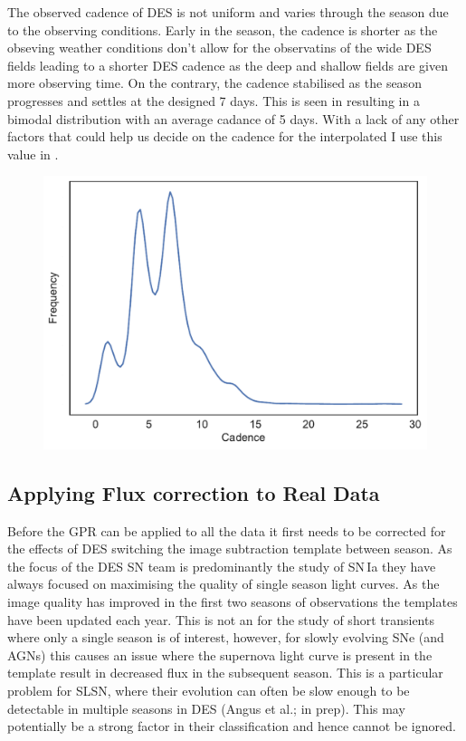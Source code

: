 The observed cadence of DES is not uniform and varies through the season due to the observing conditions. Early in the season, the cadence is shorter as the obseving weather conditions don't allow for the observatins of the wide DES fields leading to a shorter DES cadence as the deep and shallow fields are given more observing time. On the contrary, the cadence stabilised as the season progresses and settles at the designed 7 days. This is seen in  resulting in a bimodal distribution with an average cadance of 5 days. With a lack of any other factors that could help us decide on the cadence for the interpolated I use this value in .

\begin{figure}
  \includegraphics{Figures/Chapter5/Cadence.pdf}
  \caption{}
  \label{fig:cadence}
\end{figure}

\subsection{Applying Flux correction to Real Data}
Before the GPR can be applied to all the data it first needs to be corrected for the effects of DES switching the image subtraction template between season. As the focus of the DES SN team is predominantly the study of SN\,Ia they have always focused on maximising the quality of single season light curves. As the image quality has improved in the first two seasons of observations the templates have been updated each year. This is not an for the study of short transients where only a single season is of interest, however, for slowly evolving SNe (and AGNs) this causes an issue where the supernova light curve is present in the template result in decreased flux in the subsequent season. This is a particular problem for SLSN, where their evolution can often be slow enough to be detectable in multiple seasons in DES (Angus et al.; in prep). This may potentially be a strong factor in their classification and hence cannot be ignored.

